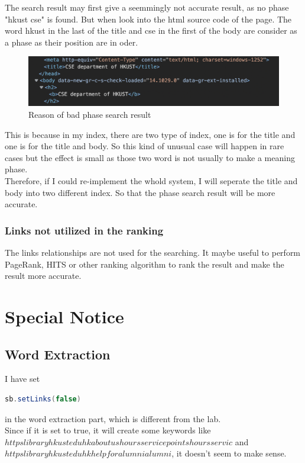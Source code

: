 \documentclass{article}
\begin{document}
        The search result may first give a seemmingly not accurate result, as no phase "hkust cse" is found. But when look into the html source code of the page. The word hkust in the last of the title and cse in the first of the body are consider as a phase as their position are in oder. 

        \begin{figure}[!htbp]
            \centering
            \includegraphics[width=15cm]{bad1.png}
            \caption{Reason of bad phase search result}
        \end{figure}
        
        This is because in my index, there are two type of index, one is for the title and one is for the title and body.
        So this kind of unusual case will happen in rare cases but the effect is small as those two word is not usually to make a meaning phase. \\

        Therefore, if I could re-implement the whold system, I will seperate the title and body into two different index. So that the phase search result will be more accurate. 

        \subsubsection*{Links not utilized in the ranking}
        The links relationships are not used for the searching. It maybe useful to perform PageRank, HITS or other ranking algorithm to rank the result and make the result more accurate.

    \section*{Special Notice}
        \subsection*{Word Extraction}
            I have set 
            \begin{lstlisting}[language=Java]
                sb.setLinks(false)
            \end{lstlisting} 
            in the word extraction part, which is different from the lab. \\[0.4em] 
            Since if it is set to true, it will create some keywords like $httpslibraryhkusteduhkaboutushoursservicepointshoursservic$ and $httpslibraryhkusteduhkhelpforalumnialumni$, it doesn't seem to make sense. 
\end{document}
